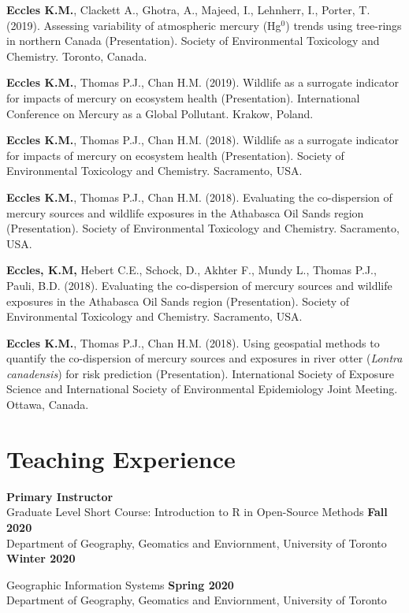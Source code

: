 \documentclass[margin,line]{res}
\begin{document}
\begin{resume}
\textbf{Eccles K.M.}, Clackett A., Ghotra, A., Majeed, I., Lehnherr, I., Porter, T. (2019). Assessing variability of atmospheric mercury (Hg$^{0}$) trends using tree-rings in northern Canada (Presentation). Society of Environmental Toxicology and Chemistry. Toronto, Canada.

\textbf{Eccles K.M.}, Thomas P.J., Chan H.M. (2019). Wildlife as a surrogate indicator for impacts of mercury on ecosystem health (Presentation). International Conference on Mercury as a Global Pollutant. Krakow, Poland.

\textbf{Eccles K.M.}, Thomas P.J., Chan H.M. (2018). Wildlife as a surrogate indicator for impacts of mercury on ecosystem health (Presentation). Society of Environmental Toxicology and Chemistry. Sacramento, USA.

\textbf{Eccles K.M.}, Thomas P.J., Chan H.M. (2018). Evaluating the co-dispersion of mercury sources and wildlife exposures in the Athabasca Oil Sands region (Presentation). Society of Environmental Toxicology and Chemistry. Sacramento, USA.

\textbf{Eccles, K.M,} Hebert C.E., Schock, D., Akhter F., Mundy L., Thomas P.J., Pauli, B.D. (2018). Evaluating the co-dispersion of mercury sources and wildlife exposures in the Athabasca Oil Sands region (Presentation). Society of Environmental Toxicology and Chemistry. Sacramento, USA.

\textbf{Eccles K.M.}, Thomas P.J., Chan H.M. (2018). Using geospatial methods to quantify the co-dispersion of mercury sources and exposures in river otter (\textit{Lontra canadensis}) for risk prediction (Presentation). International Society of Exposure Science and International Society of Environmental Epidemiology Joint Meeting. Ottawa, Canada.


\vspace*{.1in}
\section{\sc Teaching Experience}
\textbf{Primary Instructor}\\
Graduate Level Short Course: Introduction to R in Open-Source Methods \hfill {\textbf{Fall 2020}}\\
Department of Geography, Geomatics and Enviornment, University of Toronto \hfill {\textbf{Winter 2020}}

Geographic Information Systems \hfill {\textbf{Spring 2020}}\\
Department of Geography, Geomatics and Enviornment, University of Toronto


\end{resume}
\end{document}
